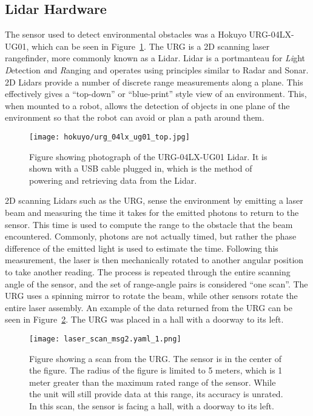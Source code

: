 \subsection{Lidar Hardware}
The sensor used to detect environmental obstacles was a Hokuyo
URG-04LX-UG01, which can be seen in Figure~\ref{fig:lidar_top1}. 
The URG is a 2D scanning laser rangefinder, more commonly known as
a Lidar. Lidar is a portmanteau for \textit{Li}ght \textit{D}etection 
\textit{a}nd \textit{R}anging and operates using principles similar 
to Radar and Sonar. 2D Lidars provide a number of discrete range measurements
along a plane. This effectively gives a ``top-down'' or ``blue-print''
style view of an environment.
This, when mounted to a robot, allows the detection of objects in one plane of
the environment so that the robot can avoid or plan a path around them.

\begin{figure}
\centering
\texttt{[image: hokuyo/urg\_04lx\_ug01\_top.jpg]}
\caption{Figure showing photograph of the URG-04LX-UG01 Lidar. It is shown
         with a USB cable plugged in, which is the method of powering
         and retrieving data from the Lidar.}
\label{fig:lidar_top1}
\end{figure}

2D scanning Lidars such as the URG, sense the environment by emitting a laser
beam and measuring the time it takes for the emitted photons to return to the sensor.
This time is used to compute the range to the obstacle that the beam encountered.
Commonly, photons are not actually timed, but rather the phase difference of the
emitted light is used to estimate the time.
Following this measurement, the laser is then mechanically rotated to another 
angular position to take another reading. The process is repeated through the 
entire scanning angle of the sensor, and the set of range-angle pairs is 
considered ``one scan''. The URG uses a spinning mirror to rotate the beam, while
other sensors rotate the entire laser assembly.
An example of the data returned from the URG can be seen in Figure~\ref{fig:lidar_scan1}.
The URG was placed in a hall with a doorway to its left.

\begin{figure}
\centering
\texttt{[image: laser\_scan\_msg2.yaml\_1.png]}
\caption{Figure showing a scan from the URG\@.
         The sensor is in the center of the figure.
         The radius of the figure is limited to 5 meters, which is 1 meter 
         greater than the maximum rated range of the sensor. While the unit will
         still provide data at this range, its accuracy is unrated.
         In this scan, the sensor is facing a hall, with a doorway to its left.}
\label{fig:lidar_scan1}
\end{figure}

